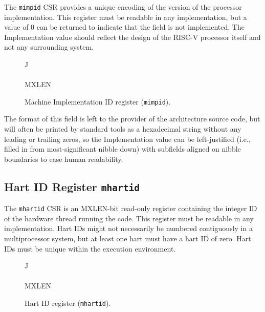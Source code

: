 The {\tt mimpid} CSR provides a unique encoding of the version of the
processor implementation.  This register must be readable in any
implementation, but a value of 0 can be returned to indicate that the
field is not implemented.  The Implementation value should reflect the
design of the RISC-V processor itself and not any surrounding system.

\begin{figure*}[h!]
{\footnotesize
\begin{center}
\begin{tabular}{J}
 \\
\hline
{}  \\
\hline
MXLEN \\
\end{tabular}
\end{center}
}
\vspace{-0.1in}
\caption{Machine Implementation ID register ({\tt mimpid}).}
\label{mimpidreg}
\end{figure*}

\begin{commentary}
The format of this field is left to the provider of the architecture
source code, but will often be printed by standard tools as a
hexadecimal string without any leading or trailing zeros, so the
Implementation value can be left-justified (i.e., filled in from
most-significant nibble down) with subfields aligned on nibble
boundaries to ease human readability.
\end{commentary}

\subsection{Hart ID Register {\tt mhartid}}

The {\tt mhartid} CSR is an MXLEN-bit read-only register
containing the integer ID of the hardware thread running the code.
This register must be readable in any implementation.  Hart IDs might
not necessarily be numbered contiguously in a multiprocessor system,
but at least one hart must have a hart ID of zero.  Hart IDs must be
unique within the execution environment.

\begin{figure*}[h!]
{\footnotesize
\begin{center}
\begin{tabular}{J}
 \\
\hline
{}\\
\hline
MXLEN \\
\end{tabular}
\end{center}
}
\vspace{-0.1in}
\caption{Hart ID register ({\tt mhartid}).}
\label{mhartidreg}
\end{figure*}


